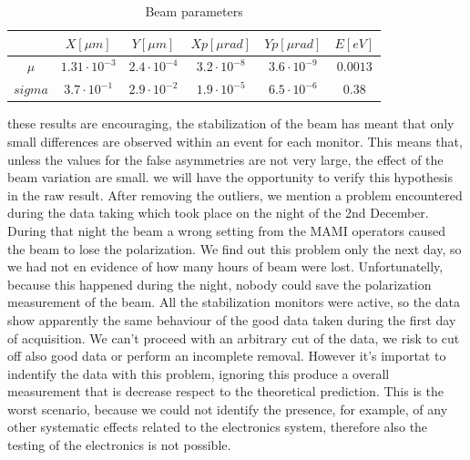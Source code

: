 \begin{table}
\centering
\begin{tabular}{|c|c|c|c|c|c|}
\hline 
\rule[-1ex]{0pt}{2.5ex} & $X [\mu m]$ & $Y[\mu m]$ & $Xp [\mu rad]$ & $Yp [\mu rad]$ & $E [eV]$ \\ 
\hline 
\rule[-1ex]{0pt}{2.5ex} $\mu$ & $1.31 \cdot 10^{-3}$ & $2.4 \cdot 10^{-4}$ & $3.2 \cdot 10^{-8} $ & $3.6 \cdot 10^{-9}$ & $0.0013$ \\ 
\hline 
\rule[-1ex]{0pt}{2.5ex} $sigma$ & $3.7 \cdot 10^{-1}$ & $2.9 \cdot 10^{-2}$ & $ 1.9 \cdot 10^{-5} $ & $6.5 \cdot 10^{-6}$ & $0.38$ \\ 
\hline 
\end{tabular}
\label{parametri} 
\caption{Beam parameters}
\end{table}

these results are encouraging, the stabilization of the beam has meant that only small differences are observed within an event for each monitor. This means that, unless the values for the false asymmetries are not very large, the effect of the beam variation are small. we will have the opportunity to verify this hypothesis in the raw result. \bigskip
After removing the outliers, we mention a problem encountered during the data taking which took place on the night of the 2nd December. During that night the beam a wrong setting from the MAMI operators caused the beam to lose the polarization. We find out this problem only the next day, so we had not en evidence of how many hours of beam were lost. Unfortunatelly,  because this happened during the night, nobody could save the polarization measurement of the beam.
All the stabilization monitors were active, so the data show apparently the same behaviour of the good data taken during the first day of acquisition. We can't proceed with an arbitrary cut of the data, we risk to cut off also good data or perform an incomplete removal. However it's importat to indentify the data with this problem, ignoring this produce a overall measurement that is decrease respect to the theoretical prediction. This is the worst scenario, because we could not identify the presence, for example, of any other systematic effects related to the electronics system, therefore also the testing of the electronics is not possible.\\
 
